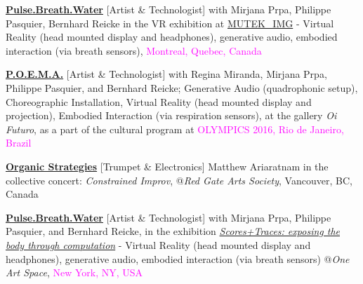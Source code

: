 \documentclass[10pt,a4paper]{moderncv} %
\begin{document}
{ {\href{https://kivanctatar.com/Pulse-Breath-Water}{\textbf{Pulse.Breath.Water}} [Artist \& Technologist] with Mirjana Prpa, Philippe Pasquier, Bernhard Reicke in the VR exhibition at \textcolor{magenta}{\href{http://www.mutek.org/en/img/2016/artworks}{MUTEK\_IMG}} - Virtual Reality (head mounted display and headphones), generative audio, embodied interaction (via breath sensors), \textcolor{magenta}{Montreal, Quebec, Canada}}



 {\textbf{\href{https://kivanctatar.com/POEMA}{P.O.E.M.A.}} [Artist \& Technologist] with Regina Miranda, Mirjana Prpa, Philippe Pasquier, and Bernhard Reicke; Generative Audio (quadrophonic setup), Choreographic Installation, Virtual Reality (head mounted display and projection), Embodied Interaction (via respiration sensors), at the gallery \textit{Oi Futuro}, as a part of the cultural program at \textcolor{magenta}{OLYMPICS 2016, Rio de Janeiro, Brazil}}


 {\href{https://kivanctatar.com/Organic-Strategies}{\textbf{Organic Strategies}} [Trumpet \& Electronics] Matthew Ariaratnam in the collective concert: \textit{Constrained Improv}, @\textit{Red Gate Arts Society}, Vancouver, BC, Canada}

 {\href{https://kivanctatar.com/Pulse-Breath-Water}{\textbf{Pulse.Breath.Water}} [Artist \& Technologist] with Mirjana Prpa, Philippe Pasquier, and Bernhard Reicke, in the exhibition \href{http://oneartspace.com/2016/03/10/scorestraces-exposing-the-body-through-computation/}{\textit{Scores+Traces: exposing the body through computation}} - Virtual Reality (head mounted display and headphones), generative audio, embodied interaction (via breath sensors) @\textit{One Art Space}, \textcolor{magenta}{New York, NY, USA}}

}
\end{document}
